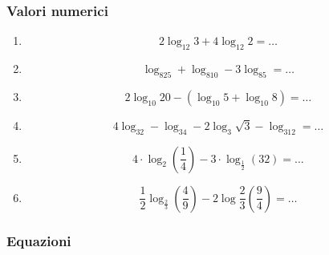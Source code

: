 \subsubsection{Valori numerici}\label{subsec:val_num}

\begin{enumerate} %
\item  
\[
2\log_{12}3+4\log_{12}2=\ldots
\]


\item \[
\log_825+\log_810-3\log_85=\ldots
\]

\item \[
2\log_{10}20-(\log_{10}5+\log_{10}8)=\ldots
\]

\item \[
4\log_32-\log_34-2\log_3\sqrt{3}-\log_312=\ldots
\]

\item \[
4\cdot\log_2\left(\frac{1}{4}\right)-3\cdot\log_{\frac{1}{2}}(32)=\ldots
\]

\item\[
\frac{1}{2}\log_{\frac{2}{3}}\left(\frac{4}{9}\right)
-2\log\frac{2}{3}\left(\frac{9}{4}\right)=\ldots
\]

\end{enumerate} %

\subsubsection{Equazioni}\label{subsec:equazioni}

